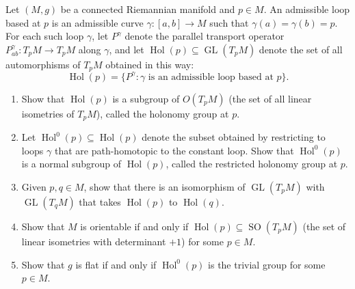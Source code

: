 \begin{exercise}
\label{prob:holonomy-group}

Let $(M,g)$ be a connected Riemannian manifold and $p \in M$. An admissible loop based at $p$ is an admissible curve $\gamma: [a,b] \to M$ such that $\gamma(a) = \gamma(b) = p$. For each such loop $\gamma$, let $P^\gamma$ denote the parallel transport operator $P^\gamma_{ab}: T_pM \to T_pM$ along $\gamma$, and let $\operatorname{Hol}(p) \subseteq \operatorname{GL}(T_pM)$ denote the set of all automorphisms of $T_pM$ obtained in this way:
\[
\operatorname{Hol}(p) = \{P^\gamma : \gamma \text{ is an admissible loop based at } p\}.
\]
\begin{enumerate}
\item[(a)] Show that $\operatorname{Hol}(p)$ is a subgroup of $O(T_pM)$ (the set of all linear isometries of $T_pM$), called the holonomy group at $p$.
\item[(b)] Let $\operatorname{Hol}^0(p) \subseteq \operatorname{Hol}(p)$ denote the subset obtained by restricting to loops $\gamma$ that are path-homotopic to the constant loop. Show that $\operatorname{Hol}^0(p)$ is a normal subgroup of $\operatorname{Hol}(p)$, called the restricted holonomy group at $p$.
\item[(c)] Given $p,q \in M$, show that there is an isomorphism of $\operatorname{GL}(T_pM)$ with $\operatorname{GL}(T_qM)$ that takes $\operatorname{Hol}(p)$ to $\operatorname{Hol}(q)$.
\item[(d)] Show that $M$ is orientable if and only if $\operatorname{Hol}(p) \subseteq \operatorname{SO}(T_pM)$ (the set of linear isometries with determinant $+1$) for some $p \in M$.
\item[(e)] Show that $g$ is flat if and only if $\operatorname{Hol}^0(p)$ is the trivial group for some $p \in M$.
\end{enumerate}
\end{exercise}
